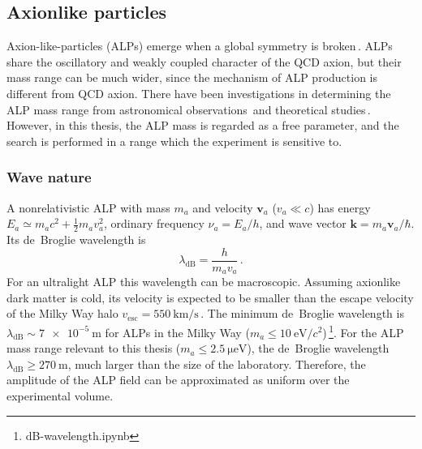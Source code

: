 \subsection{Axionlike particles}\label{sec:intro:ALP}

Axion-like-particles (ALPs) emerge when a global symmetry is broken\,\cite{Weinberg1978_NewLightBoson,Wilczek1978_StrongPTInvariance, Kim1979_WeakInteractionSinglet, Shifman1980_ConfinementCP, Dine1981_HarmlessAxion, Zhitnitsky1980_WeinbergCP}.
ALPs share the oscillatory and weakly coupled character of the QCD axion, but their mass range can be much wider, since the mechanism of ALP production is different from QCD axion.
There have been investigations in determining the ALP mass range from astronomical observations\,\cite{Marsh2016_AxionCosmology} and theoretical studies\,\cite{Zhitnitsky1980_WeinbergCP}.
 However, in this thesis, the ALP mass is regarded as a free parameter, and the search is performed in a range which the experiment is sensitive to.

\subsubsection{Wave nature}
A nonrelativistic ALP with mass $m_a$ and velocity $\mathbf{v}_a$ ($v_a \ll c$) has energy $E_a \simeq m_a c^2+\tfrac{1}{2}m_a v_a^2$, ordinary frequency $\nu_a=E_a/h$, and wave vector $\mathbf{k}=m_a\mathbf{v}_a/\hbar$.
Its de~Broglie wavelength is
\begin{equation}
    \lambda_{\mathrm{dB}}=\frac{h}{m_a v_a}
    \,.\label{eq:lambda_dB}
\end{equation}
For an ultralight ALP this wavelength can be macroscopic. 
Assuming axionlike dark matter is cold, its velocity is expected to be smaller than the escape velocity of the Milky Way halo $v_\mathrm{esc} = \SI{550}{\km/\s}$\,\cite{Evans2019_SHMRefined}.
The minimum de~Broglie wavelength is $\lambda_{\mathrm{dB}} \sim \SI{7e-5}{\meter}$ for ALPs in the Milky Way ($m_a \leq \SI{10}{\eV/c^2}$)\,\footnote{dB-wavelength.ipynb}.
For the ALP mass range relevant to this thesis ($m_a \leq \SI{2.5}{\micro\electronvolt}$), the de~Broglie wavelength $\lambda_{\mathrm{dB}} \geq \SI{270}{\meter}$, much larger than the size of the laboratory.
Therefore, the amplitude of the ALP field can be approximated as uniform over the experimental volume. 

